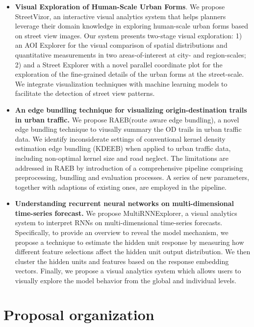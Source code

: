 \begin{itemize}[noitemsep]
	\item \textbf{Visual Exploration of Human-Scale Urban Forms}. We propose StreetVizor, an interactive visual analytics system that helps planners leverage their domain knowledge in exploring human-scale urban forms based on street view images. Our system presents two-stage visual exploration: 1) an AOI Explorer for the visual comparison of spatial distributions and quantitative measurements in two areas-of-interest at city- and region-scales; 2) and a Street Explorer with a novel parallel coordinate plot for the exploration of the fine-grained details of the urban forms at the street-scale. We integrate visualization techniques with machine learning models to facilitate the detection of street view patterns. 
	\item \textbf{An edge bundling technique for visualizing origin-destination trails in urban traffic.} We propose RAEB(route aware edge bundling), a novel edge bundling technique to viusally summary the OD trails in urban traffic data. We identify inconsiderate settings of conventional kernel density estimation edge bundling (KDEEB) when applied to urban traffic data, including non-optimal kernel size and road neglect. The limitations are addressed in RAEB by introduction of a comprehensive pipeline comprising preprocessing, bundling and evaluation processes. A series of new parameters, together with adaptions of existing ones, are employed in the pipeline. 
	\item \textbf{Understanding recurrent neural networks on multi-dimensional time-series forecast.} We propose MultiRNNExplorer, a visual analytics system to interpret RNNs on multi-dimensional time-series forecasts.  
	Specifically, to provide an overview to reveal the model mechanism, we propose a technique to estimate the hidden unit response by measuring how different feature selections affect the hidden unit output distribution. 
	We then cluster the hidden units and features based on the response embedding vectors. 
	Finally, we propose a visual analytics system which allows users to visually explore the model behavior from the global and individual levels.
\end{itemize}


\section{Proposal organization}



